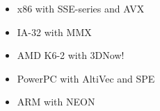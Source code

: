 \noindent\begin{minipage}[t]{\textwidth}
    \vspace{1em}
    \begin{minipage}[t]{0.4\textwidth}
        \begin{itemize}
            \item x86 with SSE-series and AVX
            \item IA-32 with MMX
            \item AMD K6-2 with 3DNow!
        \end{itemize}
    \end{minipage}
    \begin{minipage}[t]{0.6\textwidth}
        \begin{itemize}
            \item PowerPC with AltiVec and SPE
            \item ARM with NEON
        \end{itemize}
    \end{minipage}
    \vspace{1em}
\end{minipage}

